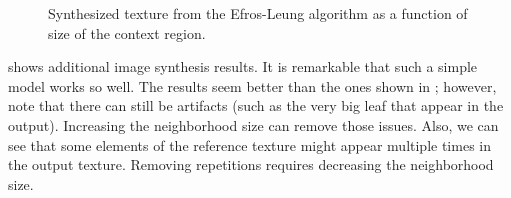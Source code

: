 {\begin{figure}
\centerline{
}
\caption{Synthesized texture from the Efros-Leung algorithm \cite{Efros99} as a function of size of the context region. %
}
\label{fig:efros1}
\end{figure}




\Fig{\ref{fig:efrosresult}} shows additional image synthesis results. It is remarkable that such a simple model works so well. The results seem better than the ones shown in \fig{\ref{fig:two_examples}}; however, note that there can still be artifacts (such as the very big leaf that appear in the output). Increasing the neighborhood size can remove those issues. Also, we can see that some elements of the reference texture might appear multiple times in the output texture. Removing repetitions requires decreasing the neighborhood size.


}
